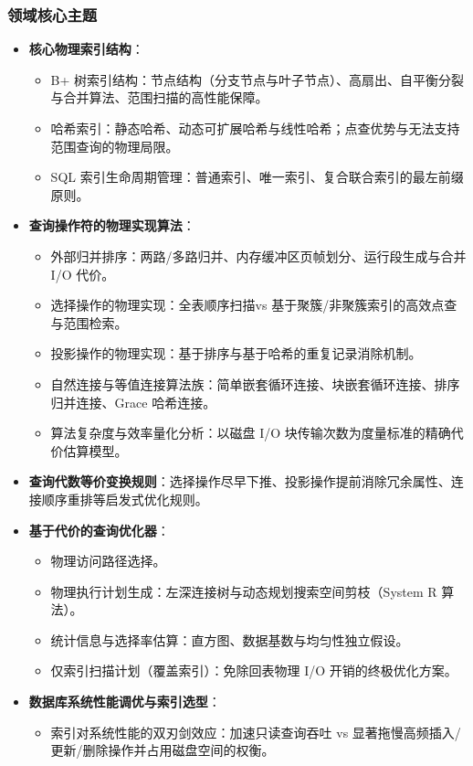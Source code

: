 \subsubsection{领域核心主题}
\begin{itemize}
    \item \textbf{核心物理索引结构}：
    \begin{itemize}
        \item B+ 树索引结构：节点结构（分支节点与叶子节点）、高扇出、自平衡分裂与合并算法、范围扫描的高性能保障。
        \item 哈希索引：静态哈希、动态可扩展哈希与线性哈希；点查优势与无法支持范围查询的物理局限。
        \item SQL 索引生命周期管理：普通索引、唯一索引、复合联合索引的最左前缀原则。
    \end{itemize}
    \item \textbf{查询操作符的物理实现算法}：
    \begin{itemize}
        \item 外部归并排序：两路/多路归并、内存缓冲区页帧划分、运行段生成与合并 I/O 代价。
        \item 选择操作的物理实现：全表顺序扫描vs 基于聚簇/非聚簇索引的高效点查与范围检索。
        \item 投影操作的物理实现：基于排序与基于哈希的重复记录消除机制。
        \item 自然连接与等值连接算法族：简单嵌套循环连接、块嵌套循环连接、排序归并连接、Grace 哈希连接。
        \item 算法复杂度与效率量化分析：以磁盘 I/O 块传输次数为度量标准的精确代价估算模型。
    \end{itemize}
    \item \textbf{查询代数等价变换规则}：选择操作尽早下推、投影操作提前消除冗余属性、连接顺序重排等启发式优化规则。
    \item \textbf{基于代价的查询优化器}：
    \begin{itemize}
        \item 物理访问路径选择。
        \item 物理执行计划生成：左深连接树与动态规划搜索空间剪枝（System R 算法）。
        \item 统计信息与选择率估算：直方图、数据基数与均匀性独立假设。
        \item 仅索引扫描计划（覆盖索引）：免除回表物理 I/O 开销的终极优化方案。
    \end{itemize}
    \item \textbf{数据库系统性能调优与索引选型}：
    \begin{itemize}
        \item 索引对系统性能的双刃剑效应：加速只读查询吞吐 vs 显著拖慢高频插入/更新/删除操作并占用磁盘空间的权衡。
    \end{itemize}
\end{itemize}

